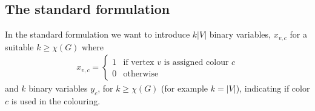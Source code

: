 \subsection{The standard formulation}
In the standard formulation we want to introduce $k|V|$ binary variables, $x_{v,c}$ for a suitable $k\geq \chi (G)$ where
\begin{align} \label{x standard}
x_{v,c} = \left\{
\begin{array}{ll}
1 & \text{if vertex }v \text{ is assigned colour } c \\ 0 & \text{otherwise}
\end{array}\right.
\end{align}
and $k$ binary variables $y_c$, for $k \geq \chi (G)$ (for example $k = |V|$), indicating if color $c$ is used in the colouring.\\
